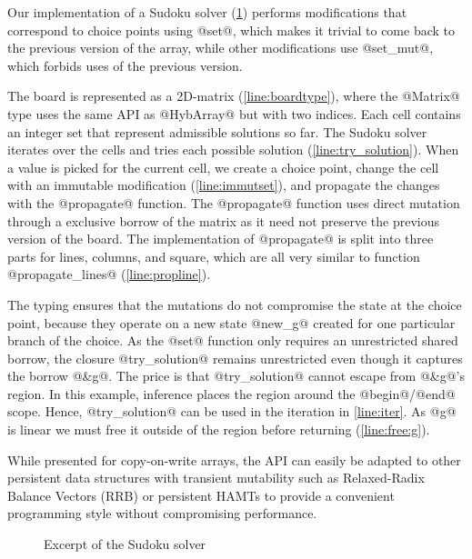 Our implementation of a Sudoku solver (\cref{ex:sudoku}) performs
modifications that correspond to choice points using @set@,
which makes it trivial to come back to the previous version
of the array, while other modifications use @set_mut@, which
forbids uses of the previous version.

The board is represented as a 2D-matrix (\cref{line:boardtype}), where
the @Matrix@ type uses the same API as @HybArray@
but with two indices.
Each cell contains an integer set that represent admissible solutions so far.
The Sudoku solver iterates over the cells and tries each possible solution (\cref{line:try_solution}).
When a value is picked for the current cell, we create a choice point,
change the cell with an immutable modification (\cref{line:immutset}), and propagate
the changes with the @propagate@ function.
The @propagate@ function uses direct mutation through a
exclusive borrow of the matrix as it need not preserve the previous
version of the board.
The implementation of @propagate@ is split into three parts
for lines, columns, and square, which are all very similar to function
@propagate_lines@ (\cref{line:propline}).

The typing ensures that the mutations do not compromise the state at
the choice point, because they operate on a new state @new_g@ created for one
particular branch of the choice.
As the @set@ function only requires an unrestricted shared borrow,
the closure @try_solution@ remains unrestricted even though
it captures the borrow @&g@. 
The price is that @try_solution@ cannot escape from
@&g@'s region. In this example, inference places the region
around the @begin@/@end@ scope.
Hence, @try_solution@ can be used in
the iteration in \cref{line:iter}.
As @g@ is linear we must free it outside of the region
before returning (\cref{line:free:g}). 

While presented for copy-on-write arrays, the API
can easily be adapted to other persistent data structures with
transient mutability such as Relaxed-Radix Balance Vectors (RRB) \cite{DBLP:journals/pacmpl/Puente17}
or persistent HAMTs \cite{bagwell2001ideal,clojurehamt} to provide  a
convenient programming style without compromising performance.

\begin{figure}
  \centering
  
    \vspace{-15pt}
  \caption{Excerpt of the Sudoku solver}
  \label{ex:sudoku}
\end{figure}

